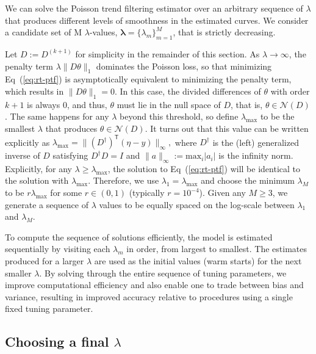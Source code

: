 \documentclass[10pt,letterpaper]{article}
\newcommand{\lr}[1]{\left(#1\right)}
\newcommand{\snorm}[1]{\lVert #1 \rVert}
\renewcommand{\top}{\mathsf{T}}
\renewcommand{\eqref}[1]{Eq~(\ref{#1})}
\begin{document}
We can solve the Poisson trend filtering estimator over an arbitrary sequence of 
$\lambda$ that produces different levels of smoothness in the estimated curves. 
We consider a candidate set of M $\lambda$-values, $\boldsymbol{\lambda} = \{\lambda_m\}_{m=1}^M$,
that is strictly decreasing.


Let $D := D^{(k+1)}$ for simplicity in the remainder of this section. As
$\lambda \to\infty$, the penalty term $\lambda \snorm{D\theta}_1$ dominates the
Poisson loss, so that minimizing \eqref{eq:rt-ptf} is asymptotically equivalent
to minimizing the penalty term, which results in $\snorm{D\theta}_1 = 0$. In
this case, the divided differences of $\theta$ with order $k+1$ is always $0$,
and thus, $\theta$ must lie in the null space of $D$, that is,
$\theta\in\mathcal{N}(D)$. The same happens for any $\lambda$ beyond this
threshold, so define $\lambda_{\textrm{max}}$ to be the smallest $\lambda$ that
produces $\theta\in\mathcal{N}(D)$. It turns out that this value can be written
explicitly as $\lambda_{\textrm{max}} = \snorm{\lr{D^{\dagger}}^{\top} \lr{\eta
- y}}_{\infty},$ where $D^{\dagger}$ is the (left) generalized inverse of $D$
satisfying $D^{\dagger} D = I$ and $\snorm{a}_{\infty} :=
\mathrm{max}_{i}|a_i|$ is the infinity norm. Explicitly, for any $\lambda \geq
\lambda_{\max}$, the solution to \eqref{eq:rt-ptf} will be identical to the
solution with $\lambda_{\max}$. Therefore, we use
$\lambda_1 = \lambda_{\max}$ and choose the minimum $\lambda_M$ to
be $r\lambda_{\max}$ for some $r \in (0,1)$ (typically $r=10^{-4}$). Given any
$M\geq 3$, we generate a sequence of $\lambda$ values to be equally spaced on
the log-scale between $\lambda_1$ and $\lambda_M$. 

To compute the sequence of solutions efficiently, the model is estimated
sequentially by visiting each $\lambda_m$ in order, from largest to smallest. The
estimates produced for a larger $\lambda$ are used as the initial values (warm
starts) for the next smaller $\lambda$. By solving through the entire sequence
of tuning parameters, we improve computational efficiency and also enable one to
trade between bias and variance, resulting in improved accuracy relative to
procedures using a single fixed tuning parameter.


\subsection{Choosing a final $\lambda$}
\label{sec:cv}
\end{document}
